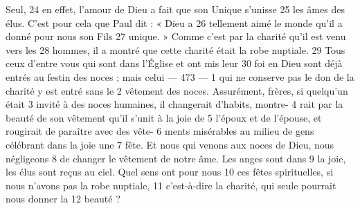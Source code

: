 Seul,	 
24	 	en effet, l'amour de Dieu a fait que son Unique s'unisse	 
25	 	les âmes des élus. C'est pour cela que Paul dit : « Dieu a	 
26	 	tellement aimé le monde qu'il a donné pour nous son Fils	 
27	 	unique. » Comme c'est par la charité qu'il est venu vers les	 
28	 	hommes, il a montré que cette charité était la robe nuptiale.	 
29	 	Tous ceux d'entre vous qui sont dans l'Église et ont mis leur	 
30	 	foi en Dieu sont déjà entrés au festin des noces ; mais celui	 
 	--- 473 ---	 
1	 	qui ne conserve pas le don de la charité y est entré sans le	 
2	 	vêtement des noces. Assurément, frères, si quelqu'un était	 
3	 	invité à des noces humaines, il changerait d'habits, montre-	 
4	 	rait par la beauté de son vêtement qu'il s'unit à la joie de	 
5	 	l'époux et de l'épouse, et rougirait de paraître avec des vête-	 
6	 	ments misérables au milieu de gens célébrant dans la joie une	 
7	 	fête. Et nous qui venons aux noces de Dieu, nous négligeons	 
8	 	de changer le vêtement de notre âme. Les anges sont dans	 
9	 	la joie, les élus sont reçus au ciel. Quel sens ont pour nous	 
10	 	ces fêtes spirituelles, si nous n'avons pas la robe nuptiale,	 
11	 	c'est-à-dire la charité, qui seule pourrait nous donner la	 
12	 	beauté ?